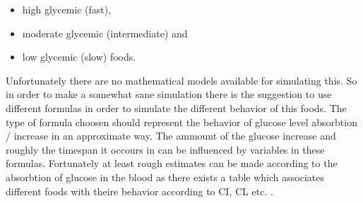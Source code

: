 \begin{itemize}
  \item high glycemic (fast),
  \item moderate glycemic (intermediate) and
  \item low glycemic (slow) foods.
\end{itemize}

Unfortunately there are no mathematical models available for simulating this.
So in order to make a somewhat sane simulation there is the suggestion to use different formulas in order to simulate the different behavior of this foods.
The type of formula choosen should represent the behavior of glucose level absorbtion / increase in an approximate way.
The ammount of the glucose increase and roughly the timespan it occours in can be influenced by variables in these formulas.
Fortunately at least rough estimates can be made according to the absorbtion of
glucose in the blood as there exists a table which associates different foods
with theire behavior according to CI, CL etc. \cite{glycemicindex:table}.

